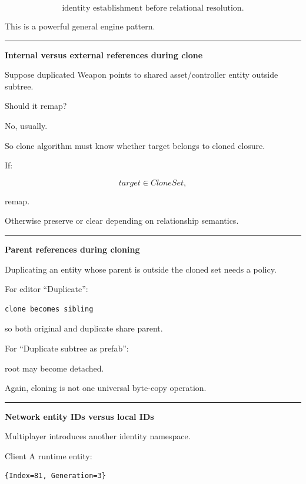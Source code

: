 \[
\boxed{
\text{identity establishment before relational resolution}.
}
\]

This is a powerful general engine pattern.

\begin{center}\rule{0.5\linewidth}{0.5pt}\end{center}

\textbf{Internal versus external references during clone}

Suppose duplicated Weapon points to shared asset/controller entity outside subtree.

Should it remap?

No, usually.

So clone algorithm must know whether target belongs to cloned closure.

If:

\[
target\in CloneSet,
\]

remap.

Otherwise preserve or clear depending on relationship semantics.

\begin{center}\rule{0.5\linewidth}{0.5pt}\end{center}

\textbf{Parent references during cloning}

Duplicating an entity whose parent is outside the cloned set needs a policy.

For editor ``Duplicate'':

\begin{verbatim}
clone becomes sibling
\end{verbatim}

so both original and duplicate share parent.

For ``Duplicate subtree as prefab'':

root may become detached.

Again, cloning is not one universal byte-copy operation.

\begin{center}\rule{0.5\linewidth}{0.5pt}\end{center}

\textbf{Network entity IDs versus local IDs}

Multiplayer introduces another identity namespace.

Client A runtime entity:

\begin{verbatim}
{Index=81, Generation=3}
\end{verbatim}

